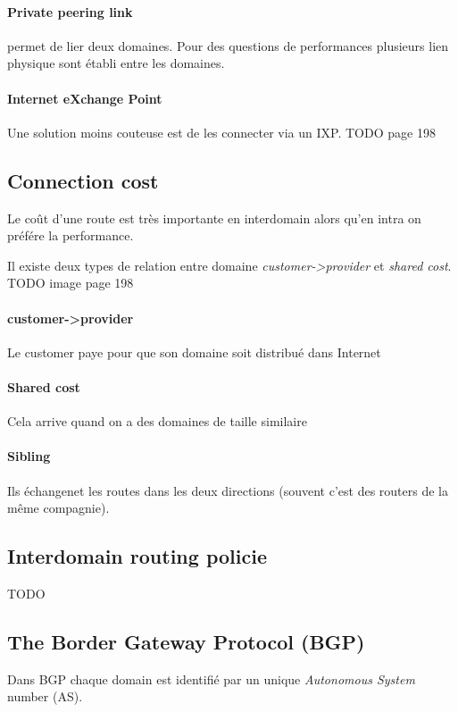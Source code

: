 \documentclass{report}
\begin{document}
\paragraph{Private peering link} permet de lier deux domaines. Pour des questions
de performances plusieurs lien physique sont établi entre les domaines.

\paragraph{Internet eXchange Point} Une solution moins couteuse est de les connecter
via un IXP. TODO page 198

\subsection{Connection cost} Le coût d'une route est très importante en interdomain
alors qu'en intra on préfére la performance.

Il existe deux types de relation entre domaine \textit{customer->provider} et \textit{
shared cost}.
TODO image page 198

\paragraph{customer->provider}
Le customer paye pour que son domaine soit distribué dans Internet

\paragraph{Shared cost}
Cela arrive quand on a des domaines de taille similaire 

\paragraph{Sibling}
Ils échangenet les routes dans les deux directions (souvent c'est des routers
de la même compagnie).

\subsection{Interdomain routing policie}
TODO

\subsection{The Border Gateway Protocol (BGP)}
Dans BGP chaque domain est identifié par un unique \textit{Autonomous System} number (AS).
\end{document}
